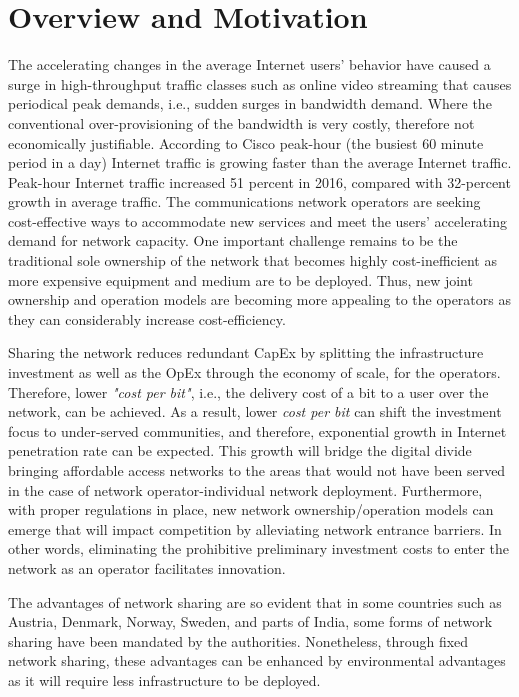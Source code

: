 \section{Overview and Motivation}
The accelerating changes in the average Internet users' behavior have caused a surge in high-throughput traffic classes such as online video streaming that causes periodical peak demands, i.e., sudden surges in bandwidth demand. Where the conventional over-provisioning of the bandwidth is very costly, therefore not economically justifiable. According to Cisco \cite{cisco_2017} peak-hour (the busiest 60 minute period in a day) Internet traffic is growing faster than the average Internet traffic. Peak-hour Internet traffic increased 51 percent in 2016, compared with 32-percent growth in average traffic. 
The communications network operators are seeking cost-effective ways to accommodate new services and meet the users' accelerating demand for network capacity. One important challenge remains to be the traditional sole ownership of the network that becomes highly cost-inefficient as more expensive equipment and medium are to be deployed. Thus, new joint ownership and operation models are becoming more appealing to the operators as they can considerably increase cost-efficiency.

Sharing the network reduces redundant \ac{CapEx} by splitting the infrastructure investment as well as the \ac{OpEx} through the economy of scale, for the operators. Therefore, lower \textit{"cost per bit"}, i.e., the delivery cost of a bit to a user over the network, can be achieved. As a result, lower \textit{cost per bit} can shift the investment focus to under-served communities, and therefore, exponential growth in Internet penetration rate can be expected. This growth will bridge the digital divide bringing affordable access networks to the areas that would not have been served in the case of network operator-individual network deployment. Furthermore, with proper regulations in place, new network ownership/operation models can emerge that will impact competition by alleviating network entrance barriers. In other words, eliminating the prohibitive preliminary investment costs to enter the network as an operator facilitates innovation.

The advantages of network sharing are so evident that in some countries such as Austria, Denmark, Norway, Sweden, and parts of India, some forms of network sharing have been mandated by the authorities. Nonetheless, through fixed network sharing, these advantages can be enhanced by environmental advantages as it will require less infrastructure to be deployed.

